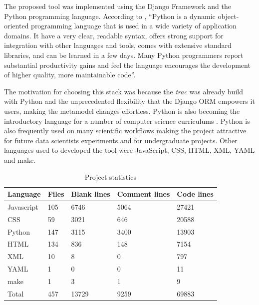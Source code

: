 The proposed tool was implemented using the Django Framework and the Python programming language. According to \cite{python2014}, “Python is a dynamic object-oriented programming language that is used in a wide variety of application domains. It have  a very clear, readable syntax,  offers strong support for integration with other languages and tools, comes with extensive standard libraries, and can be learned in a few days. Many Python programmers report substantial productivity gains and feel the language encourages the development of higher quality, more maintainable code”.

The motivation for choosing this stack was because the \textit{trac} was already build with Python and the unprecedented flexibility that the Django \acf{ORM} empowers it users, making the metamodel changes effortless. Python is also becoming the introductory language for a number of computer science curriculums \citep{Sanders2008}. Python is also frequently used on many scientific workflows \citep{Bui2010} making the project attractive for future data scientists experiments and for undergraduate projects. Other languages used to developed the tool were JavaScript, CSS, HTML, XML, YAML and make.

\begin{table}
\begin{center}
    \begin{tabular}{|l|l|l|l|l|}
    \hline
    Language   & Files & Blank lines & Comment lines & Code lines  \\ \hline
    Javascript & 105   & 6746  & 5064    & 27421 \\ 
    CSS        & 59    & 3021  & 646     & 20588 \\ 
    Python     & 147   & 3115  & 3400    & 13903 \\ 
    HTML       & 134   & 836   & 148     & 7154  \\ 
    XML        & 10    & 8     & 0       & 797   \\ 
    YAML       & 1    & 0     & 0       & 11   \\ 
    make       & 1     & 3     & 1       & 9     \\ \hline
    Total      & 457   & 13729 & 9259    & 69883 \\ \hline
    \end{tabular}
    \caption{Project statistics}
    \label{table:statistics}
    \end{center}
\end{table}


